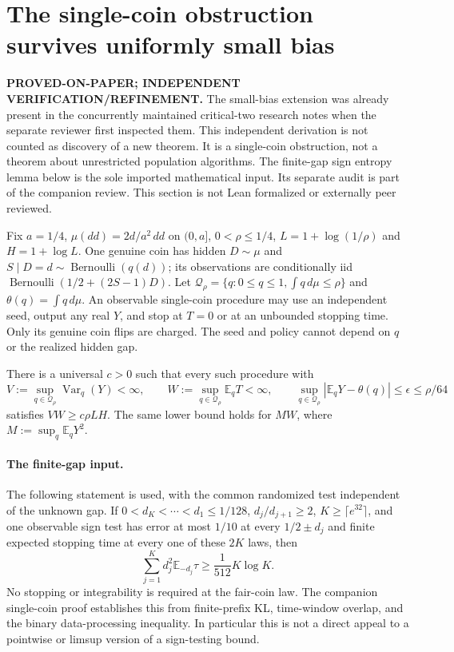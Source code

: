\section{The single-coin obstruction survives uniformly small bias}
\label{sec:small-bias-obstruction}
\noindent\textbf{PROVED-ON-PAPER; INDEPENDENT VERIFICATION/REFINEMENT.}
The small-bias extension was already present in the concurrently maintained
critical-two research notes when the separate reviewer first inspected them.
This independent derivation is not counted as discovery of a new theorem.
It is a single-coin obstruction, not a theorem about unrestricted population
algorithms. The finite-gap sign entropy lemma below is the sole imported
mathematical input. Its separate audit is part of the companion review.
This section is not Lean formalized or externally peer reviewed.

Fix $a=1/4$, $\mu(dd)=2d/a^2\,dd$ on $(0,a]$,
$0<\rho\le1/4$, $L=1+\log(1/\rho)$ and $H=1+\log L$.
One genuine coin has hidden $D\sim\mu$ and
$S\mid D=d\sim\operatorname{Bernoulli}(q(d))$; its observations are
conditionally iid $\operatorname{Bernoulli}(1/2+(2S-1)D)$.
Let $\mathcal Q_\rho=\{q:0\le q\le1,\int q\,d\mu\le\rho\}$ and
$\theta(q)=\int q\,d\mu$. An observable single-coin procedure may use an
independent seed, output any real $Y$, and stop at $T=0$ or at an unbounded
stopping time. Only its genuine coin flips are charged. The seed and policy
cannot depend on $q$ or the realized hidden gap.

\begin{theorem}\label{sb:theorem}
There is a universal $c>0$ such that every such procedure with
\[
 V:=\sup_{q\in\mathcal Q_\rho}\operatorname{Var}_q(Y)<\infty,
 \qquad W:=\sup_{q\in\mathcal Q_\rho}\mathbb E_qT<\infty,
 \qquad
 \sup_{q\in\mathcal Q_\rho}|\mathbb E_qY-\theta(q)|\le\epsilon
 \le\rho/64
\]
satisfies $VW\ge c\rho LH$. The same lower bound holds for
$MW$, where $M:=\sup_q\mathbb E_qY^2$.
\end{theorem}

\paragraph{The finite-gap input.}
The following statement is used, with the common randomized test independent
of the unknown gap. If
$0<d_K<\cdots<d_1\le1/128$, $d_j/d_{j+1}\ge2$,
$K\ge\lceil e^{32}\rceil$, and one observable sign test has error at most
$1/10$ at every $1/2\pm d_j$ and finite expected stopping time at every one
of these $2K$ laws, then
\begin{equation}\label{sb:entropy}
 \sum_{j=1}^K d_j^2\mathbb E_{-d_j}\tau
 \ge\frac1{512}K\log K.
\end{equation}
No stopping or integrability is required at the fair-coin law. The companion
single-coin proof establishes this from finite-prefix KL, time-window
overlap, and the binary data-processing inequality. In particular this is
not a direct appeal to a pointwise or limsup version of a sign-testing bound.

